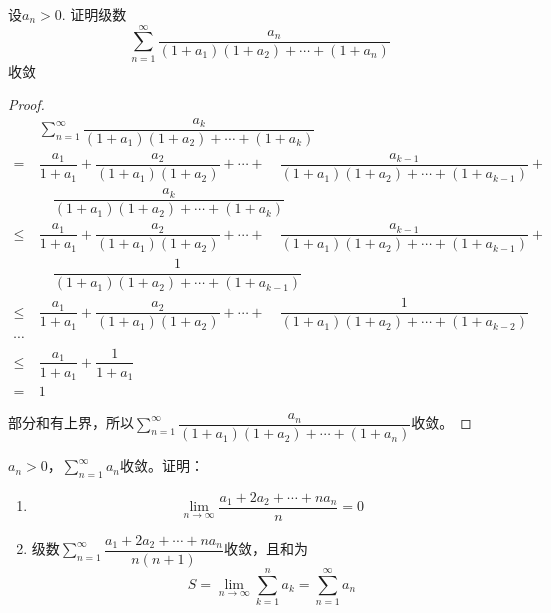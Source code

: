 \begin{proposition}
    
    设$a_n > 0$. 证明级数
    \[\sum\limits_{n = 1}^{\infty}{\dfrac{a_n}{(1 + a_1)(1 + a_2) + \cdots + (1 + a_n)}}\]
    收敛

\end{proposition}

\begin{proof}
    
    \begin{align*}
        & \sum\limits_{n = 1}^{\infty}{\dfrac{a_k}{(1 + a_1)(1 + a_2) + \cdots + (1 + a_k)}} \\
        = \  & \dfrac{a_1}{1 + a_1} + \dfrac{a_2}{(1 + a_1)(1 + a_2)} + \cdots + \quad \dfrac{a_{k - 1}}{(1 + a_1)(1 + a_2) + \cdots + (1 + a_{k - 1})} + \\
        & \quad \dfrac{a_k}{(1 + a_1)(1 + a_2) + \cdots + (1 + a_k)} \\
        \leq \ & \dfrac{a_1}{1 + a_1} + \dfrac{a_2}{(1 + a_1)(1 + a_2)} + \cdots + \quad \dfrac{a_{k - 1}}{(1 + a_1)(1 + a_2) + \cdots + (1 + a_{k - 1})} + \\
        & \quad \dfrac{1}{(1 + a_1)(1 + a_2) + \cdots + (1 + a_{k - 1})} \\
        \leq \ & \dfrac{a_1}{1 + a_1} + \dfrac{a_2}{(1 + a_1)(1 + a_2)} + \cdots + \quad \dfrac{1}{(1 + a_1)(1 + a_2) + \cdots + (1 + a_{k - 2})} \\
        \cdots & \\
        \leq \ & \dfrac{a_1}{1 + a_1} + \dfrac{1}{1 + a_1} \\
        = \ & 1 
    \end{align*}

    部分和有上界，所以$\sum\limits_{n = 1}^{\infty}{\dfrac{a_n}{(1 + a_1)(1 + a_2) + \cdots + (1 + a_n)}}$收敛。

\end{proof}

\begin{proposition}
    
    $a_n > 0$，$\sum\limits_{n = 1}^{\infty}{a_n}$收敛。证明：

    \begin{enumerate}
        
        \item 
                \[\lim\limits_{n \to \infty}{\dfrac{a_1 + 2a_2 + \cdots + na_n}{n}} = 0\]
        
        \item   
                级数$\sum\limits_{n = 1}^{\infty}{\dfrac{a_1 + 2a_2 + \cdots + na_n}{n(n + 1)}}$收敛，且和为
                \[S = \lim\limits_{n \to \infty}{\sum\limits_{k  = 1}^{n}{a_k}} = \sum\limits_{n = 1}^{\infty}{a_n}\]

    \end{enumerate}

\end{proposition}


